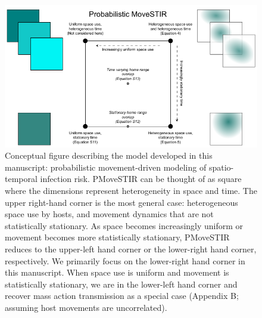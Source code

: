 \documentclass[letterpaper]{article}
\begin{document}
\begin{figure}
    \includegraphics[width=\textwidth]{figures/conceptual_figure_pmovestir_mod.pdf}
    \caption{Conceptual figure describing the model developed in this manuscript: probabilistic movement-driven modeling of spatio-temporal infection risk. PMoveSTIR can be thought of as square where the dimensions represent heterogeneity in space and time. The upper right-hand corner is the most general case: heterogeneous space use by hosts, and movement dynamics that are not statistically stationary.  As space becomes increasingly uniform or movement becomes more statistically stationary, PMoveSTIR reduces to the upper-left hand corner or the lower-right hand corner, respectively.  We primarily focus on the lower-right hand corner in this manuscript.  When space use is uniform and movement is statistically stationary, we are in the lower-left hand corner and recover mass action transmission as a special case (Appendix B; assuming host movements are uncorrelated).}
  \label{fig:square}
\end{figure}
\end{document}
